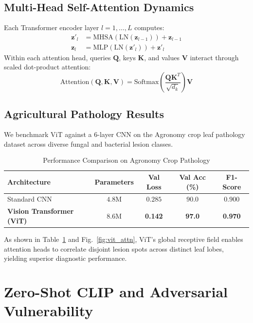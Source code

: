 \documentclass[conference]{IEEEtran}
\begin{document}
\subsection{Multi-Head Self-Attention Dynamics}
Each Transformer encoder layer $l = 1, \dots, L$ computes:
\begin{align}
\mathbf{z}'_l &= \text{MHSA}(\text{LN}(\mathbf{z}_{l-1})) + \mathbf{z}_{l-1} \\
\mathbf{z}_l &= \text{MLP}(\text{LN}(\mathbf{z}'_l)) + \mathbf{z}'_l
\end{align}
Within each attention head, queries $\mathbf{Q}$, keys $\mathbf{K}$, and values $\mathbf{V}$ interact through scaled dot-product attention:
\begin{equation}
\text{Attention}(\mathbf{Q}, \mathbf{K}, \mathbf{V}) = \text{Softmax}\left( \frac{\mathbf{Q} \mathbf{K}^T}{\sqrt{d_k}} \right) \mathbf{V}
\end{equation}

\subsection{Agricultural Pathology Results}
We benchmark ViT against a 6-layer CNN on the Agronomy crop leaf pathology dataset across diverse fungal and bacterial lesion classes.
\begin{table}[htbp]
\caption{Performance Comparison on Agronomy Crop Pathology}
\centering
\begin{tabular}{@{}lcccc@{}}
\toprule
\textbf{Architecture} & \textbf{Parameters} & \textbf{Val Loss} & \textbf{Val Acc (\%)} & \textbf{F1-Score} \\
\midrule
Standard CNN & $4.8\text{M}$ & $0.285$ & $90.0$ & $0.900$ \\
\textbf{Vision Transformer (ViT)} & $8.6\text{M}$ & \textbf{0.142} & \textbf{97.0} & \textbf{0.970} \\
\bottomrule
\end{tabular}
\label{tab:vit_agronomy}
\end{table}
As shown in Table~\ref{tab:vit_agronomy} and Fig.~\ref{fig:vit_attn}, ViT's global receptive field enables attention heads to correlate disjoint lesion spots across distinct leaf lobes, yielding superior diagnostic performance.

\section{Zero-Shot CLIP and Adversarial Vulnerability}
\end{document}

